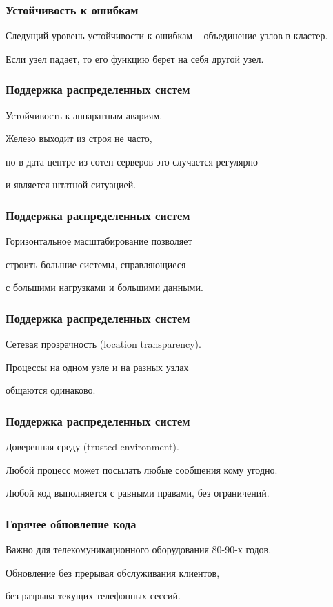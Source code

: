 \documentclass[10pt]{beamer}
\begin{document}
\begin{frame}
  \frametitle{Устойчивость к ошибкам}
  Следущий уровень устойчивости к ошибкам -- объединение узлов в кластер.
  \par \bigskip
  Если узел падает, то его функцию берет на себя другой узел.
\end{frame}


\begin{frame}
  \frametitle{Поддержка распределенных систем}
  Устойчивость к аппаратным авариям.
  \par \bigskip
  Железо выходит из строя не часто,
  \par \bigskip
  но в дата центре из сотен серверов это случается регулярно
  \par \bigskip
  и является штатной ситуацией.
\end{frame}

\begin{frame}
  \frametitle{Поддержка распределенных систем}
  Горизонтальное масштабирование позволяет
  \par \bigskip
  строить большие системы, справляющиеся
  \par \bigskip
  с большими нагрузками и большими данными.
\end{frame}

\begin{frame}
  \frametitle{Поддержка распределенных систем}
  Сетевая прозрачность (location transparency).
  \par \bigskip
  Процессы на одном узле и на разных узлах
  \par \bigskip
  общаются одинаково.
\end{frame}

\begin{frame}
  \frametitle{Поддержка распределенных систем}
  Доверенная среду (trusted environment).
  \par \bigskip
  Любой процесс может посылать любые сообщения кому угодно.
  \par \bigskip
  Любой код выполняется с равными правами, без ограничений.
\end{frame}

\begin{frame}
  \frametitle{Горячее обновление кода}
  Важно для телекомуникационного оборудования 80-90-х годов.
  \par \bigskip
  Обновление без прерывая обслуживания клиентов,
  \par \bigskip
  без разрыва текущих телефонных сессий.
\end{frame}
\end{document}
